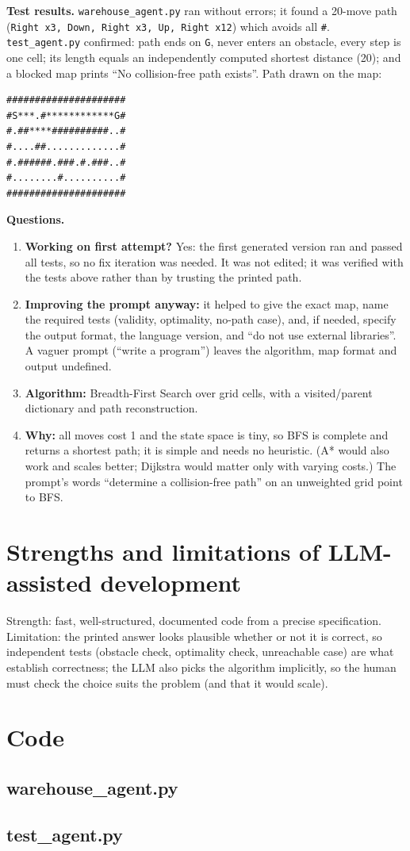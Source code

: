 \documentclass[10pt,a4paper]{article}
\begin{document}
\textbf{Test results.} \texttt{warehouse\_agent.py} ran without errors; it found a 20-move path (\texttt{Right x3, Down, Right x3, Up, Right x12}) which avoids all \texttt{\#}. \texttt{test\_agent.py} confirmed: path ends on \texttt{G}, never enters an obstacle, every step is one cell; its length equals an independently computed shortest distance (20); and a blocked map prints ``No collision-free path exists''. Path drawn on the map:
\begin{Verbatim}
#####################
#S***.#************G#
#.##****##########..#
#....##.............#
#.######.###.#.###..#
#........#..........#
#####################
\end{Verbatim}

\textbf{Questions.}
\begin{enumerate}[leftmargin=*]
\item \textbf{Working on first attempt?} Yes: the first generated version ran and passed all tests, so no fix iteration was needed. It was not edited; it was verified with the tests above rather than by trusting the printed path.
\item \textbf{Improving the prompt anyway:} it helped to give the exact map, name the required tests (validity, optimality, no-path case), and, if needed, specify the output format, the language version, and ``do not use external libraries''. A vaguer prompt (``write a program'') leaves the algorithm, map format and output undefined.
\item \textbf{Algorithm:} Breadth-First Search over grid cells, with a visited/parent dictionary and path reconstruction.
\item \textbf{Why:} all moves cost 1 and the state space is tiny, so BFS is complete and returns a shortest path; it is simple and needs no heuristic. (A* would also work and scales better; Dijkstra would matter only with varying costs.) The prompt's words ``determine a collision-free path'' on an unweighted grid point to BFS.
\end{enumerate}

\section*{Strengths and limitations of LLM-assisted development}
Strength: fast, well-structured, documented code from a precise specification. Limitation: the printed answer looks plausible whether or not it is correct, so independent tests (obstacle check, optimality check, unreachable case) are what establish correctness; the LLM also picks the algorithm implicitly, so the human must check the choice suits the problem (and that it would scale).

\section*{Code}
\subsection*{warehouse\_agent.py}
\subsection*{test\_agent.py}
\end{document}
